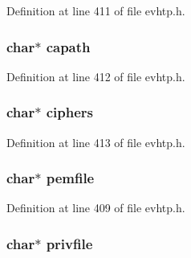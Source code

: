 Definition at line 411 of file evhtp.h.

\hypertarget{structevhtp__ssl__cfg__s_a8331a8443119478cd6b1daeb707a94dc}{
\subsubsection[{capath}]{\setlength{\rightskip}{0pt plus 5cm}char$\ast$ {\bf capath}}}
\label{structevhtp__ssl__cfg__s_a8331a8443119478cd6b1daeb707a94dc}


Definition at line 412 of file evhtp.h.

\hypertarget{structevhtp__ssl__cfg__s_a3e4edb91e89d3cffda8059a32d60e0e8}{
\subsubsection[{ciphers}]{\setlength{\rightskip}{0pt plus 5cm}char$\ast$ {\bf ciphers}}}
\label{structevhtp__ssl__cfg__s_a3e4edb91e89d3cffda8059a32d60e0e8}


Definition at line 413 of file evhtp.h.

\hypertarget{structevhtp__ssl__cfg__s_a166ccef38a88683b0b0896eecb4994e1}{
\subsubsection[{pemfile}]{\setlength{\rightskip}{0pt plus 5cm}char$\ast$ {\bf pemfile}}}
\label{structevhtp__ssl__cfg__s_a166ccef38a88683b0b0896eecb4994e1}


Definition at line 409 of file evhtp.h.

\hypertarget{structevhtp__ssl__cfg__s_a316b5f5b982f40f1492e9b732af977f4}{
\subsubsection[{privfile}]{\setlength{\rightskip}{0pt plus 5cm}char$\ast$ {\bf privfile}}}
\label{structevhtp__ssl__cfg__s_a316b5f5b982f40f1492e9b732af977f4}


